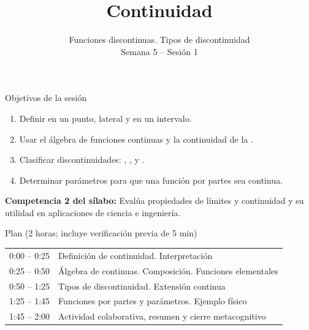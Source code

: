 \documentclass[10pt,aspectratio=169]{beamer}
\title[Continuidad]{Continuidad}
\subtitle{Funciones discontinuas. Tipos de discontinuidad\\[2pt]\small Semana 5 -- Sesión 1}
\begin{document}
\begin{frame}
  \titlepage
\end{frame}

\begin{frame}{Objetivos de la sesión}
  \begin{enumerate}
    \item Definir  en un punto, lateral y en un intervalo.
    \item Usar el álgebra de funciones continuas y la continuidad de la .
    \item Clasificar discontinuidades: , ,  y .
    \item Determinar parámetros para que una función por partes sea continua.
  \end{enumerate}
  \vspace{1mm}
  {\small\textbf{Competencia 2 del sílabo:} Evalúa propiedades de límites y continuidad y su utilidad en aplicaciones de ciencia e ingeniería.}
  \begin{block}{Plan (2 horas; incluye verificación previa de 5 min)}
    \begin{tabular}{ll}
      0:00 -- 0:25 & Definición de continuidad. Interpretación\\
      0:25 -- 0:50 & Álgebra de continuas. Composición. Funciones elementales\\
      0:50 -- 1:25 & Tipos de discontinuidad. Extensión continua\\
      1:25 -- 1:45 & Funciones por partes y parámetros. Ejemplo físico\\
      1:45 -- 2:00 & Actividad colaborativa, resumen y cierre metacognitivo
    \end{tabular}
  \end{block}
\end{frame}
\end{document}
